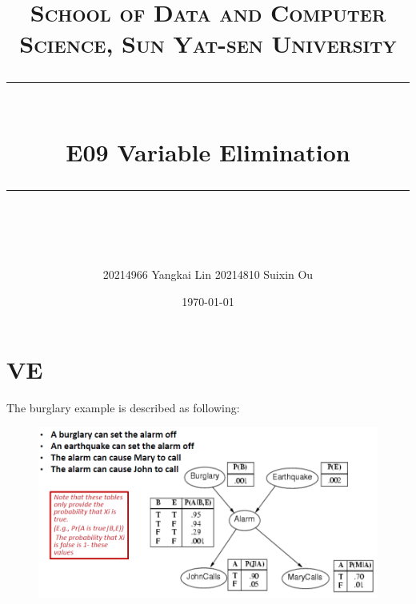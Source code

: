 \documentclass[a4paper, 11pt]{article}
\title{	
\normalfont \normalsize
\textsc{School of Data and Computer Science, Sun Yat-sen University} \\ [25pt] %
\rule{\textwidth}{0.5pt} \\[0.4cm] %
\huge  E09 Variable Elimination \\ %
\rule{\textwidth}{2pt} \\[0.5cm] %
\author{20214966 Yangkai Lin 20214810 Suixin Ou}
\date{\normalsize\today}
}
\begin{document}
\maketitle
\tableofcontents
\newpage


\section{VE}

The burglary example is described as following:
\begin{figure}[h]
  \centering

  \includegraphics[width=14cm]{Pic/burglary}
\end{figure}
\end{document}
